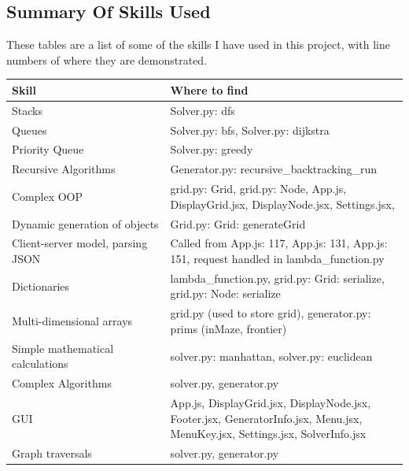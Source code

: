 \documentclass[titlepage]{article}
\begin{document}
\subsection{Summary Of Skills Used}
These tables are a list of some of the skills I have used in this project, with line numbers of where they are demonstrated.
\begin{center}
    
    \begin{tabular}{ |p{0.4\linewidth}|p{0.8\linewidth}| }
        \hline
        Skill & Where to find \\
        \hline
        \hline
        Stacks & Solver.py: dfs \\
        \hline
        Queues & Solver.py: bfs, Solver.py: dijkstra\\
        \hline
        Priority Queue & Solver.py: greedy \\
        \hline
        Recursive Algorithms & Generator.py: recursive\_backtracking\_run \\
        \hline
        Complex OOP & grid.py: Grid, grid.py: Node, App.js, DisplayGrid.jsx, DisplayNode.jsx, Settings.jsx,  \\
        \hline
        Dynamic generation of objects & Grid.py: Grid: generateGrid \\
        \hline
        Client-server model, parsing JSON & Called from App.js: 117, App.js: 131, App.js: 151, request handled in lambda\_function.py \\
        \hline
        Dictionaries & lambda\_function.py, grid.py: Grid: serialize, grid.py: Node: serialize \\
        \hline
        Multi-dimensional arrays & grid.py (used to store grid), generator.py: prims (inMaze, frontier) \\
        \hline 
        Simple mathematical calculations & solver.py: manhattan, solver.py: euclidean \\
        \hline
        Complex Algorithms & solver.py, generator.py \\
        \hline
        GUI & App.js, DisplayGrid.jsx, DisplayNode.jsx, Footer.jsx, GeneratorInfo.jsx, Menu.jsx, MenuKey.jsx, Settings.jsx, SolverInfo.jsx \\
        \hline
        Graph traversals & solver.py, generator.py \\
        \hline
    \end{tabular}

\end{center}
\end{document}
